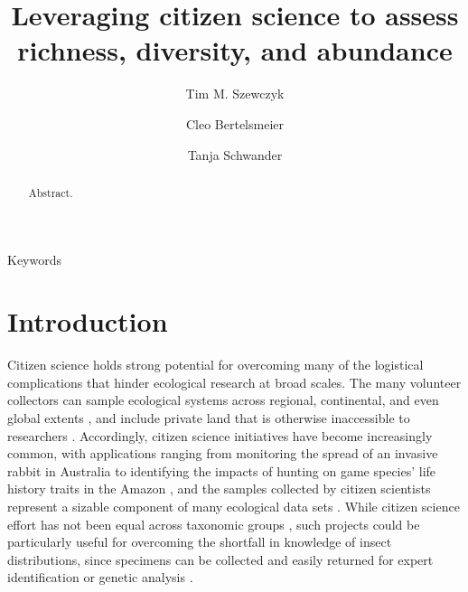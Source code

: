 \documentclass[preprint,review,times,12pt,3p]{elsarticle}
\begin{document}
\begin{frontmatter}

\title{Leveraging citizen science to assess richness, diversity, and abundance}

\author[DEE]{Tim M. Szewczyk}
\author[DEE]{Cleo Bertelsmeier}
\author[DEE]{Tanja Schwander}

\address[DEE]{Department of Ecology and Evolution, University of Lausanne}


\begin{abstract}
Abstract.
\end{abstract}

\begin{keyword}
Keywords
\end{keyword}

\end{frontmatter}
\linenumbers



\section{Introduction}
\label{S:1}

Citizen science holds strong potential for overcoming many of the logistical complications that hinder ecological research at broad scales. The many volunteer collectors can sample ecological systems across regional, continental, and even global extents \citep{Theobald2015}, and include private land that is otherwise inaccessible to researchers \citep{Pernat2020}. Accordingly, citizen science initiatives have become increasingly common, with applications ranging from monitoring the spread of an invasive rabbit in Australia \citep{Roy-Dufresne2019} to identifying the impacts of hunting on game species' life history traits in the Amazon \citep{ElBizri2020}, and the samples collected by citizen scientists represent a sizable component of many ecological data sets \citep{Poisson2020}.  While citizen science effort has not been equal across taxonomic groups \citep{Theobald2015,Troudet2017}, such projects could be particularly useful for overcoming the shortfall in knowledge of insect distributions, since specimens can be collected and easily returned for expert identification or genetic analysis \citep{Pernat2020}.
\end{document}
